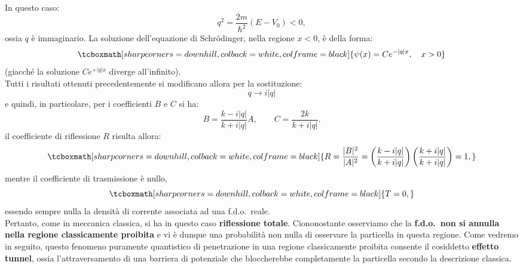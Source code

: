\documentclass[a4paper,12pt,oneside]{book}
\begin{document}
In questo caso:
	\begin{equation}
		q^2=\frac{2m}{\hbar ^2}\left( E- V_0 \right)<0,
	\end{equation}
ossia $q$ è immaginario. La soluzione dell'equazione di Schr\"{o}dinger, nella regione $x<0$, è della forma:
	\begin{equation}
		\tcboxmath[sharp corners=downhill, colback=white, colframe=black]{	
			\psi (x) = Ce^{-|q|x}, \quad x>0
			}
	\end{equation}
(giacché la soluzione $\displaystyle{Ce^{+|q|x}}$ diverge all'infinito).\\
Tutti i risultati ottenuti precedentemente si modificano allora per la sostituzione:
	\begin{equation}
		q \rightarrow i|q|
	\end{equation}
e quindi, in particolare, per i coefficienti $B$ e $C$ si ha:
	\begin{equation}
		B=\frac{k-i|q|}{k+i|q|}A, \qquad C=\frac{2k}{k+i|q|}.
	\end{equation}
il coefficiente di riflessione $R$ risulta allora:
	\begin{equation}
		\tcboxmath[sharp corners=downhill, colback=white, colframe=black]{	
			R=\frac{|B|^2}{|A|^2}=\left(\frac{k-i|q|}{k+i|q|}\right)\left(\frac{k+i|q|}{k+i|q|}\right)=1,
			}
	\end{equation}
mentre il coefficiente di trasmissione è nullo,
	\begin{equation}
		\tcboxmath[sharp corners=downhill, colback=white, colframe=black]{			
			T=0,
			}
	\end{equation}
essendo sempre nulla la densità di corrente associata ad una f.d.o.~reale.\\

Pertanto, come in meccanica classica, si ha in questo caso \textbf{riflessione totale}. Ciononostante osserviamo che la \textbf{f.d.o.~non si annulla nella regione classicamente proibita} e vi è dunque una probabilità non nulla di osservare la particella in questa regione. Come vedremo in seguito, questo fenomeno puramente quantistico di penetrazione in una regione classicamente proibita consente il cosiddetto \textbf{effetto tunnel}, ossia l'attraversamento di una barriera di potenziale che bloccherebbe completamente la particella secondo la descrizione classica.
\end{document}
